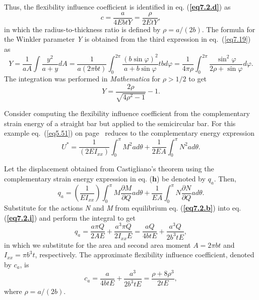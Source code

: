\documentclass{AeroStructure-ERJohnson}
\begin{document}
\begin{example}
\noindent Thus, the flexibility influence coefficient is identified in eq. (\textbf{\ref{eq7.2.d}}) as
\begin{equation}
c=\frac{a}{4 E b t Y}=\frac{\rho}{2 E t Y}, \label{eq7.2.e}\tag{e}
\end{equation}
in which the radius-to-thickness ratio is defined by $\rho=a /(2 b)$. The formula for the Winkler parameter \textit{Y} is obtained from the third expression in eq.~(\ref{eq7.19}) as
\begin{equation}
Y=\frac{1}{a A} \int \frac{y^{2}}{a+y} d A=\frac{1}{a(2 \pi b t)} \int_{0}^{2 \pi} \frac{(b \sin \varphi)^{2}}{a+b \sin \varphi} t b d \varphi=\frac{1}{4 \pi \rho} \int_{0}^{2 \pi} \frac{\sin ^{2} \varphi}{2 \rho+\sin \varphi} d \varphi. \label{eq7.2.f}\tag{f}
\end{equation}
The integration was performed in \textit{Mathematica} for $\rho>1 / 2$ to get
\begin{equation}
Y=\frac{2 \rho}{\sqrt{4 \rho^{2}-1}}-1. \label{eq7.2.g}\tag{g}
\end{equation}

Consider computing the flexibility influence coefficient from the complementary strain energy of a straight bar but applied to the semicircular bar. For this example eq.~(\ref{eq5.51}) on page~\pageref{eq5.51} reduces to the complementary energy expression
\begin{equation}
U^{*}=\frac{1}{\left(2 E I_{x x}\right)} \int_{0}^{\pi} M^{2} a d \theta+\frac{1}{2 E A} \int_{0}^{\pi} N^{2} a d \theta. \label{eq7.2.h}\tag{h}
\end{equation}

\vspace*{-1pc}

\noindent Let the displacement obtained from Castigliano's theorem using the complementary strain energy expression in eq. (\textbf{h}) be denoted by $q_{a}$. Then,
\begin{equation}
q_{a}=\left(\frac{1}{E I_{x x}}\right) \int_{0}^{\pi} M \frac{\partial M}{\partial Q} a d \theta+\frac{1}{E A} \int_{0}^{\pi} N \frac{\partial N}{\partial Q} a d \theta. \label{eq7.2.i}\tag{i}
\end{equation}
Substitute for the actions \textit{N} and \textit{M} from equilibrium eq. (\textbf{\ref{eq7.2.b}}) into eq. (\textbf{\ref{eq7.2.i}}) and perform the integral to get
\begin{equation}
q_{a}=\frac{a \pi Q}{2 A E}+\frac{a^{3} \pi Q}{2 I_{x x} E}=\frac{a Q}{4 b t E}+\frac{a^{3} Q}{2 b^{3} t E}, \label{eq7.2.j}\tag{j}
\end{equation}
in which we substitute for the area and second area moment $A=2\pi bt$ and $I_{x x}=\pi b^{3} t$, respectively. The approximate flexibility influence coefficient, denoted by $c_{a}$, is
\begin{equation}
c_{a}=\frac{a}{4 b t E}+\frac{a^{3}}{2 b^{3} t E}=\frac{\rho+8 \rho^{3}}{2 t E}, \label{eq7.2.k}\tag{k}
\end{equation}
where $\rho=a /(2 b)$.


\end{example}
\end{document}
